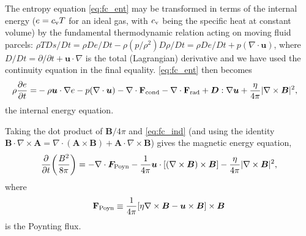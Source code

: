\documentclass[12pt]{article} %
\newcommand{\pderiv}[2]{\frac{\partial#1}{\partial#2}}
\newcommand{\curl}{\nabla\times}
\newcommand{\Div}{\nabla\cdot}
\newcommand{\cv}{c_{\rm{v}}}
\begin{document}
	The entropy equation \eqref{eq:fc_ent} may be transformed in terms of the internal energy ($e=\cv T$ for an ideal gas, with $\cv$ being the specific heat at constant volume) by the fundamental thermodynamic relation acting on moving fluid parcels: $\rho T Ds/Dt  = \rho De/Dt - \rho (p/\rho^2)D\rho/Dt = \rho De/Dt  + p(\Div\bm{u})$, where $D/Dt = \partial/\partial t + \bm{u}\cdot\nabla$ is the total (Lagrangian) derivative and we have used the continuity equation in the final equality. \eqref{eq:fc_ent} then becomes
	\begin{align}
	\rho \pderiv{e}{t} = &-\rho \bm{u}\cdot\nabla e  -p(\Div\bm{u}) - \nabla\cdot\mathbf{F}_{\rm{cond}} -\nabla\cdot\mathbf{F}_{\rm{rad}}  + \bm{D}:\nabla\bm{u} + \frac{\eta}{4\pi}|\curl\bm{B}|^2,\label{eq:fc_en}
	\end{align}
    the internal energy equation. 
    
 	Taking the dot product of $\bm{B}/4\pi$ and \eqref{eq:fc_ind} (and using the identity $\bm{B}\cdot\curl\bm{A} = \nabla\cdot(\bm{A}\times\bm{B}) + \bm{A}\cdot\curl\bm{B}$) gives the magnetic energy equation,
	\begin{align}
	\pderiv{}{t}\bigg{(}\frac{B^2}{8\pi}\bigg{)} = -\Div\bm{F}_{\rm{Poyn}} -\frac{1}{4\pi}\bm{u}\cdot[(\curl\bm{B})\times\bm{B}] - \frac{\eta}{4\pi}|\curl\bm{B}|^2, \label{eq:fc_me}
	\end{align}
	where 
	\begin{align*}
	\mathbf{F}_{\rm{Poyn}} \equiv \frac{1}{4\pi}[\eta\curl\bm{B} - \bm{u}\times\bm{B}]\times\bm{B}
	\end{align*}
	is the Poynting flux. 
	
\end{document}
